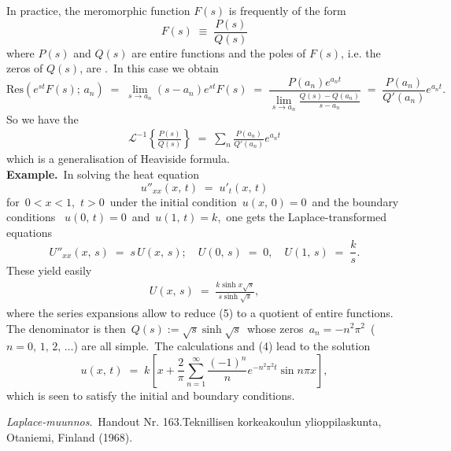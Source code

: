 \documentclass[12pt]{article}
\theoremstyle{definition}
\begin{document}
In practice, the meromorphic function $F(s)$ is frequently of the form
$$F(s) \;\equiv\; \frac{P(s)}{Q(s)}$$
where $P(s)$ and $Q(s)$ are entire functions and the poles of $F(s)$, i.e. the zeros of $Q(s)$, are .\, In this case we obtain
$$\mbox{Res}\left(e^{st}F(s);\,a_n\right) \;=\; \lim_{s\to a_n}(s\!-\!a_n)e^{st}F(s) 
\;=\; \frac{P(a_n)e^{a_nt}}{\lim_{s\to a_n}\frac{Q(s)-Q(a_n)}{s-a_n}} 
\;=\; \frac{P(a_n)}{Q'(a_n)}e^{a_nt}.$$
So we have the 
\begin{align}
\mathcal{L}^{-1}\!\left\{\frac{P(s)}{Q(s)}\right\} \;=\; \sum_n\frac{P(a_n)}{Q'(a_n)}e^{a_nt}
\end{align}
which is a generalisation of Heaviside formula.\\


\textbf{Example.}\, In solving the heat equation 
$$u''_{xx}(x,\,t) \;=\; u'_t(x,\,t)$$
for\, $0 < x < 1$,\, $t > 0$\, under the initial condition \,$u(x,\,0) = 0$\, and the boundary conditions \, 
$u(0,\,t) = 0$\, and\, $u(1,\,t) = k$,\, one gets the Laplace-transformed equations
$$U''_{xx}(x,\,s) \;=\; s\,U(x,\,s); \quad U(0,\,s) \;=\; 0, \quad U(1,\,s) \;=\; \frac{k}{s}.$$
These yield easily
\begin{align}
U(x,\,s) \;=\; \frac{k\sinh{x\sqrt{s}}}{s\sinh\sqrt{s}},
\end{align}
where the series expansions allow to reduce (5) to a quotient of entire functions.\, The denominator is then\, $Q(s) := \sqrt{s}\sinh{\sqrt{s}}$\, whose zeros \,$a_n = -n^2\pi^2$\, ($n = 0,\,1,\,2,\,\ldots$) are all simple.\, The calculations and (4) lead to the solution
$$u(x,\,t) \;=\; k\left[x+\frac{2}{\pi}\sum_{n=1}^\infty\frac{(-1)^n}{n}e^{-n^2\pi^2t}\sin{n\pi x}\right],$$
which is seen to satisfy the initial and boundary conditions.


\begin{thebibliography}{9}
 {\em Laplace-muunnos}.\, Handout Nr. 163.\quad Teknillisen korkeakoulun ylioppilaskunta, Otaniemi, Finland (1968).
\end{thebibliography}

\end{document}
